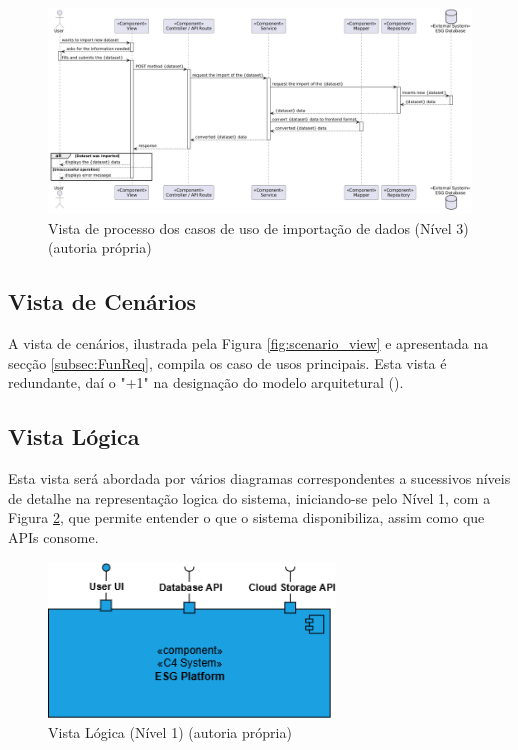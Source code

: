 \begin{figure}[H]
\centering
\includegraphics[width=\linewidth]{frontmatter/assets/diagrams/Process Views/LVL3/uc-07-lvl3.png}
\caption{Vista de processo dos casos de uso de importação de dados (Nível 3) (autoria própria)}
\label{fig:UC7-lvl3}
\end{figure}

\subsection{Vista de Cenários}

A vista de cenários, ilustrada pela Figura \ref{fig:scenario_view} e apresentada na secção \ref{subsec:FunReq}, compila os caso de usos principais. Esta vista é redundante, daí o "+1" na designação do modelo arquitetural (\cite{Kruchten1995}).

\subsection{Vista Lógica}

Esta vista será abordada por vários diagramas correspondentes a sucessivos níveis de detalhe na representação logica do sistema, iniciando-se pelo Nível 1, com a Figura \ref{fig:logical_view_lv1}, que permite entender o que o sistema disponibiliza, assim como que APIs consome.

\begin{figure}[H]
    \centering
    \includegraphics[width=3in,keepaspectratio]{frontmatter/assets/diagrams/Logical View/Logical View Lv1.drawio.png}
    \caption{Vista Lógica (Nível 1) (autoria própria)}
    \label{fig:logical_view_lv1}
\end{figure}

